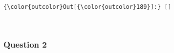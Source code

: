 \documentclass[11pt]{article}
\begin{document}
\begin{Verbatim}[commandchars=\\\{\}]
{\color{outcolor}Out[{\color{outcolor}189}]:} []
\end{Verbatim}
            
    \begin{center}
    \end{center}
    { \hspace*{\fill} \\}
    
    \subsubsection{Question 2}\label{question-2}
\end{document}

